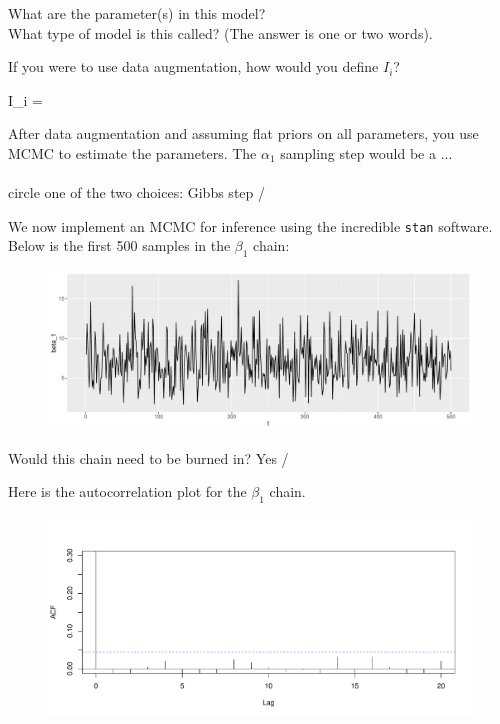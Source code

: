 \documentclass[12pt]{article}
\begin{document}
\begin{enumerate}
 What are the parameter(s) in this model?\\

 What type of model is this called? (The answer is one or two words).\\


 If you were to use data augmentation, how would you define $I_i$?

\beqn
\hspace{-1.5cm}I_i = 
\eeqn 

 After data augmentation and assuming flat priors on all parameters, you use MCMC to estimate the parameters. The $\alpha_1$ sampling step would be a ...  \\~\\ circle one of the two choices: Gibbs step / 


We now implement an MCMC for inference using the incredible \texttt{stan} software. Below is the first 500 samples in the $\beta_1$ chain:

\begin{figure}[htp]
\centering
\includegraphics[width=6in]{beta_1}
\end{figure}

 Would this chain need to be burned in? Yes /  
\pagebreak

Here is the autocorrelation plot for the $\beta_1$ chain.

\vspace{-0.5cm}
\begin{figure}[htp]
\centering
\includegraphics[width=6in]{beta_1_acf}
\end{figure}
\vspace{-0.5cm}


\end{enumerate}
\end{document}

